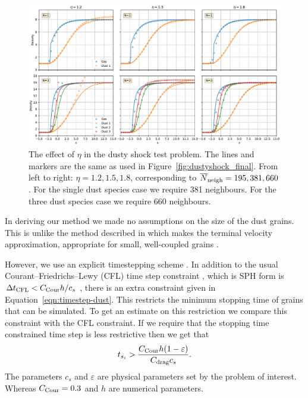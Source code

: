 \documentclass[fleqn,usenatbib]{mnras}
\begin{document}
\begin{figure}
   \begin{center}
      \includegraphics[width=\textwidth]{figs/dustyshock_hfact.pdf}
      \caption{The effect of \(\eta\) in the dusty shock test problem.
         The lines and markers are the same as used in
         Figure~\ref{fig:dustyshock_final}. From left to right: \(\eta =
         1.2, 1.5, 1.8\), corresponding to \(\overline{N}_{\rm neigh} = 195,
         381, 660\). For the single dust species case we require 381 neighbours.
         For the three dust species case we require 660 neighbours.%
         \label{fig:dustyshock_hfact}}
   \end{center}
\end{figure}

In deriving our method we made no assumptions on the size of the dust grains.
This is unlike the method described in \citet{Hutchison2018MNRAS.476.2186H}
which makes the terminal velocity approximation, appropriate for small,
well-coupled grains \citep{Youdin2005ApJ...620..459Y}.

However, we use an explicit timestepping scheme
\citep{Price2018PASA...35...31P}. In addition to the usual
Courant–Friedrichs–Lewy (CFL) time step constraint
\citep{Courant1928MatAn.100...32C}, which is SPH form is \(\Delta t_{\rm CFL} <
C_{\rm Cour} h/c_s\) \citep{Price2018PASA...35...31P}, there is an extra
constraint given in Equation~\ref{eqn:timestep-dust}. This restricts the minimum
stopping time of grains that can be simulated. To get an estimate on this
restriction we compare this constraint with the CFL constraint. If we require
that the stopping time constrained time step is less restrictive then we get
that
%
\begin{align}
   t_{s_i} > \frac{C_{\rm Cour} h (1 - \varepsilon)}{C_{\rm drag} c_s}.
\end{align}
%
The parameters \(c_s\) and \(\varepsilon\) are physical parameters set by the
problem of interest. Whereas \(C_{\rm Cour} = 0.3\) and \(h\) are numerical
parameters.
\end{document}
